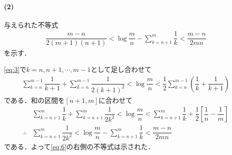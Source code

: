\documentclass[../../main.tex]{subfiles}
\begin{document}
\paragraph{(2)}

与えられた不等式
\begin{align}
  \dfrac{m-n}{2(m+1)(n+1)}<\log\dfrac{m}{n}-\sum_{k=n+1}^m\dfrac{1}{k}<\dfrac{m-n}{2mn} \label{eq:6}
\end{align}
を示す．

\cref{eq:3}で$k=n,n+1,\cdots,m-1$として足し合わせて
\begin{align}
  \sum_{k=n}^{m-1} \dfrac{1}{k+1} + \sum_{k=n}^{m-1} \dfrac{1}{2(k+1)^2}
  < \log\dfrac{m}{n}
  < \dfrac{1}{2}\sum_{k=n}^{m-1}\left(\dfrac{1}{k} + \dfrac{1}{k+1}\right)
\end{align}
である．和の区間を$[n+1,m]$に合わせて
\begin{align}
  & \sum_{k=n+1}^{m} \dfrac{1}{k} + \sum_{k=n+1}^{m} \dfrac{1}{2k^2}
  < \log\dfrac{m}{n}
  < \sum_{k=n+1}^{m}\dfrac{1}{k} + \dfrac{1}{2}\left[\dfrac{1}{n} - \dfrac{1}{m}\right] \\
  \therefore
  & \sum_{k=n+1}^{m} \dfrac{1}{2k^2}
  < \log\dfrac{m}{n} - \sum_{k=n+1}^{m} \dfrac{1}{k}
  < \dfrac{m-n}{2mn} \label{eq:7}
\end{align}
である．よって\cref{eq:6}の右側の不等式は示された．
\end{document}
